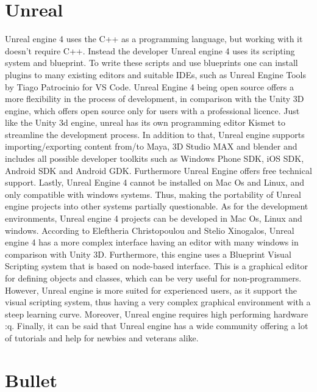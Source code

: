 \documentclass[
	12pt, 
	a4paper, 
]{article}
\begin{document}
	\section{Unreal}
	Unreal engine 4 uses the C++ as a programming language, but working with it doesn't require C++. Instead the developer Unreal engine 4 uses its scripting system and blueprint\cite{hamalainen2020game}. To write these scripts and use blueprints one can install plugins to many existing editors and suitable IDEs, such as Unreal Engine Tools by Tiago Patrocinio for VS Code. Unreal Engine 4 being open source offers a more flexibility in the process of development, in comparison with the Unity 3D engine, which offers open source only for users with a professional licence\cite{christopoulou2017overview}.\newline
	Just like the Unity 3d engine, unreal has its own programming editor Kismet to streamline the development process. In addition to that, Unreal engine supports importing/exporting content from/to Maya, 3D Studio MAX and blender and includes all possible developer toolkits such as Windows Phone SDK, iOS SDK, Android SDK and Android GDK. Furthermore Unreal Engine offers free technical support. Lastly, Unreal Engine 4 cannot be installed on Mac Os and Linux, and only compatible with windows systems. Thus, making the portability of Unreal engine projects into other systems partially questionable\cite{christopoulou2017overview}.\newline
	As for the development environments, Unreal engine 4 projects can be developed in Mac Os, Linux and windows. According to Eleftheria Christopoulou and Stelio Xinogalos, Unreal engine 4 has a more complex interface having an editor with many windows in comparison with Unity 3D. Furthermore, this engine uses a Blueprint Visual Scripting system that is based on node-based interface. This is a graphical editor for defining objects and classes, which can be very useful for non-programmers. However, Unreal engine is more suited for experienced users, as it support the visual scripting system, thus having a very complex graphical environment with a steep learning curve. Moreover, Unreal engine requires high performing hardware :q\cite{christopoulou2017overview}. Finally, it can be said that Unreal engine has a wide community offering a lot of tutorials and help for newbies and veterans alike.
	\section{Bullet}\label{bullet}
\end{document}
